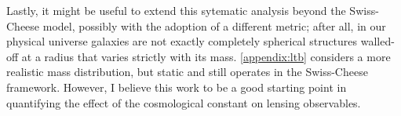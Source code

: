 Lastly, it might be useful to extend this sytematic analysis beyond the Swiss-Cheese model, possibly with the adoption of a different metric; after all, in our physical universe galaxies are not exactly completely spherical structures walled-off at a radius that varies strictly with its mass. \autoref{appendix:ltb} considers a more realistic mass distribution, but static and still operates in the Swiss-Cheese framework. However, I believe this work to be a good starting point in quantifying the effect of the cosmological constant on lensing observables. 

